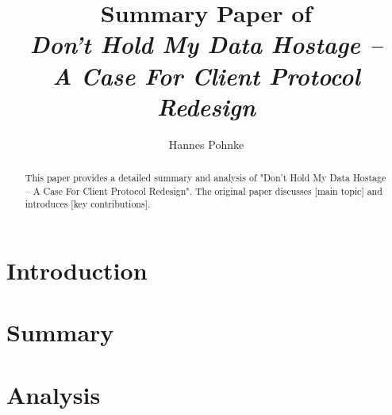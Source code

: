 \documentclass[sigconf]{acmart}
\begin{document}
\title{Summary Paper of \\ \textit{Don’t Hold My Data Hostage – \\A Case For Client Protocol Redesign}}

\author{Hannes Pohnke}


\begin{abstract}
This paper provides a detailed summary and analysis of "Don’t Hold My Data Hostage – A Case For Client Protocol Redesign". The original paper discusses [main topic] and introduces [key contributions].
\end{abstract}


\maketitle

\section{Introduction}

\section{Summary}

\section{Analysis}



\end{document}
